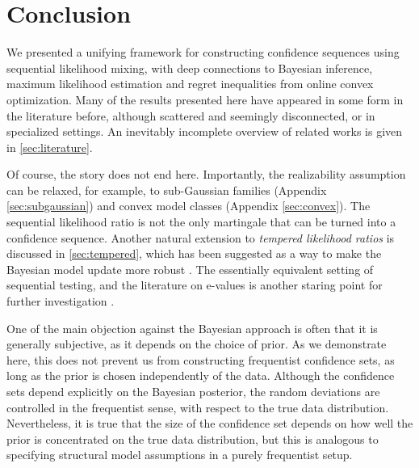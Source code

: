 \section{Conclusion}

We presented a unifying framework for constructing confidence sequences using sequential likelihood mixing, with deep connections to Bayesian inference, maximum likelihood estimation and regret inequalities from online convex optimization. Many of the results presented here have appeared in some form in the literature before, although scattered and seemingly disconnected, or in specialized settings. An inevitably incomplete overview of related works is given in \cref{sec:literature}. %




Of course, the story does not end here. Importantly, the realizability assumption can be relaxed, for example, to sub-Gaussian families (Appendix \ref{sec:subgaussian}) and convex model classes (Appendix \ref{sec:convex}). The sequential likelihood ratio is not the only martingale that can be turned into a confidence sequence. Another natural extension to \emph{tempered likelihood ratios} is discussed in \cref{sec:tempered}, which has been suggested as a way to make the Bayesian model update more robust \citep[e.g.,][]{grunwald2012safe}. The essentially equivalent setting of sequential testing, and the literature on e-values is another staring point for further investigation \citep{grunwald2020safe}.

One of the main objection against the Bayesian approach is often that it is generally subjective, as it depends on the choice of prior. As we demonstrate here, this does not prevent us from constructing frequentist confidence sets, as long as the prior is chosen independently of the data. Although the confidence sets depend explicitly on the Bayesian posterior, the random deviations are controlled in the frequentist sense, with respect to the true data distribution. Nevertheless, it is true that the size of the confidence set depends on how well the prior is concentrated on the true data distribution, but this is analogous to specifying structural model assumptions in a purely frequentist setup. 

